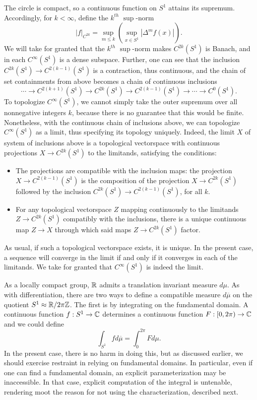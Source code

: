 \documentclass[12pt]{amsart}
\begin{document}
	The circle is compact, so a continuous function on $S^1$ attains its supremum. Accordingly, for $k<\infty$, define the $k^{th}$ $\sup$-norm
		\begin{equation*}
			|f |_{C^{2k}}=\sup_{m\leq k} \left( \sup_{x \in S^1} |\Delta^m f(x)| \right).
		\end{equation*}
	We will take for granted that the $k^{th}$ $\sup$-norm makes $C^{2k}(S^1)$ is Banach, and in each $C^\infty(S^1)$ is a dense subspace. Further, one can see that the inclusion $C^{2k}(S^1)\to C^{2(k-1)}(S^1)$ is a contraction, thus continuous, and the chain of set containments from above becomes a chain of continuous inclusions
		\begin{equation*}
			\cdots \to C^{2(k+1)}(S^1) \to C^{2k}(S^1) \to C^{2(k-1)}(S^1) \to \cdots \to C^0(S^1).
		\end{equation*}
	To topologize $C^\infty(S^1)$, we cannot simply take the outer supremum over all nonnegative integers $k$, because there is no guarantee that this would be finite. Nonetheless, with the continuous chain of inclusions above, we can topologize $C^\infty(S^1)$ as a limit, thus specifying its topology uniquely.  Indeed, the limit $X$ of system of inclusions above is a topological vectorspace with continuous projections $X\to C^{2k}(S^1)$ to the limitands, satisfying the conditions:
	\begin{itemize}
		\item The projections are compatible with the inclusion maps: the projection $X\to C^{2(k-1)}(S^1)$ is the composition of the projection $X\to C^{2k}(S^1)$ followed by the inclusion $C^{2k}(S^1)\to C^{2(k-1)}(S^1)$, for all $k$.
		\item For any topological vectorspace $Z$ mapping continuously to the limitands $Z\to C^{2k}(S^1)$ compatibly with the inclusions, there is a unique continuous map $Z\to X$ through which said maps $Z\to C^{2k}(S^1)$ factor.
	\end{itemize}
As usual, if such a topological vectorspace exists, it is unique. In the present case, a sequence will converge in the limit  if and only if it converges in each of the limitands. We take for granted that $C^\infty(S^1)$ is indeed the limit.

As a locally compact group, $\mathbb{R}$ admits a translation invariant measure $d\mu$. As with differentiation, there are two ways to define a compatible measure $d\overline{\mu}$  on the quotient $S^1\approx \mathbb{R}/2\pi \mathbb{Z}$. The first is by integrating on the fundamental domain. A continuous function $f:S^1\to \mathbb{C}$ determines a continuous function $F:[0,2\pi)\to \mathbb{C}$ and we could define
	\begin{equation*}
		\int_{S^1} fd\overline{\mu} = \int_0^{2\pi} F d\mu.
	\end{equation*}
 In the present case, there is no harm in doing this, but as discussed earlier, we should exercise restraint in relying on fundamental domains. In particular, even if one can find a fundamental domain, an explicit parameterization may be inaccessible. In that case, explicit computation of the integral is untenable, rendering moot the reason for not using the characterization, described next.
 
\end{document}
